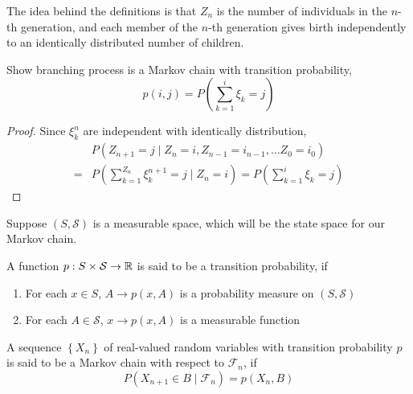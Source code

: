 \begin{remark}
	The idea behind the definitions is that $Z_{n}$ is the number of individuals in the $n$-th generation, and each member of the $n$-th generation gives birth independently to an identically distributed number of children.
\end{remark}

\begin{example}
	Show branching process is a Markov chain with transition probability,
	\begin{equation*}
		p(i,j)=P\left(\sum_{k=1}^{i}\xi_{k}=j\right)
	\end{equation*}
\end{example}

\begin{proof}
	Since $\xi_{k}^{n}$ are independent with identically distribution,
	\begin{equation*}
		\begin{aligned}
			  & P\left(Z_{n+1}=j\mid Z_{n}=i,Z_{n-1}=i_{n-1},\ldots Z_{0}=i_{0}\right)                            \\
			= & P\left(\sum_{k=1}^{Z_{n}}\xi_{k}^{n+1}=j\mid Z_{n}=i\right)=P\left(\sum_{k=1}^{i}\xi_{k}=j\right)
		\end{aligned}
	\end{equation*}
\end{proof}

Suppose $(S, \mathcal{S})$ is a measurable space, which will be the state space for our Markov chain.

\begin{definition}
	A function $p:S\times\mathcal{S}\rightarrow{\mathbb R}$ is said to be a transition probability, if
	\begin{enumerate}
		\item For each $x\in S$, $A\rightarrow p(x,A)$ is a probability measure on $(S,\mathcal{S})$
		\item For each $A\in\mathcal{S}$, $x\rightarrow p(x,A)$ is a measurable function
	\end{enumerate}
\end{definition}
\begin{definition}
	A sequence $\left\{X_{n}\right\}$ of real-valued random variables with transition probability $p$ is said to be a Markov chain with respect to $\mathcal{F}_{n}$, if
	\begin{equation}
		P\left(X_{n+1}\in B\mid\mathcal{F}_{n}\right)=p\left(X_{n},B\right)
	\end{equation}
\end{definition}

